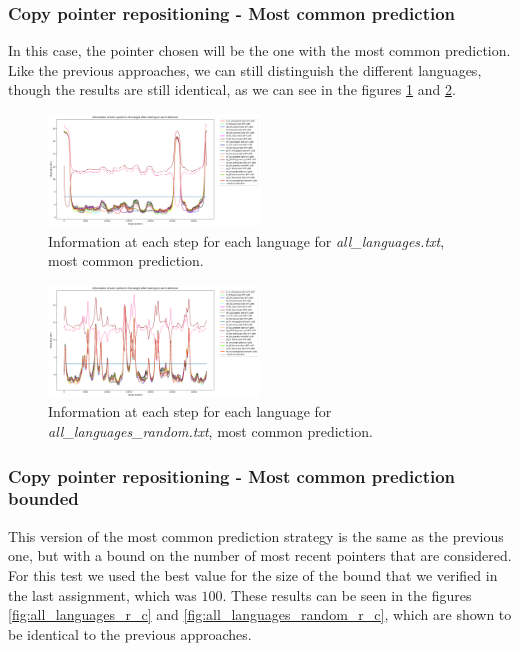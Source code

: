 \documentclass{article}
\begin{document}
\subsubsection{Copy pointer repositioning - Most common prediction}
\label{subsubsec:results_locate_lang_most_common_prediction}

In this case, the pointer chosen will be the one with the most common prediction.
Like the previous approaches, we can still distinguish the different languages, though the results are still identical, as we can see in the figures \ref{fig:all_languages_r_m} and \ref{fig:all_languages_random_r_m}.

\begin{figure}
    \centering
    \includegraphics[width=0.5\textwidth]{../results/all_languages/-r_m.png}
    \caption{Information at each step for each language for \textit{all\_languages.txt}, most common prediction.}
    \label{fig:all_languages_r_m}
\end{figure}

\begin{figure}
    \centering
    \includegraphics[width=0.5\textwidth]{../results/all_languages_random/-r_m.png}
    \caption{Information at each step for each language for \textit{all\_languages\_random.txt}, most common prediction.}
    \label{fig:all_languages_random_r_m}
\end{figure}

\subsubsection{Copy pointer repositioning - Most common prediction bounded}
\label{subsubsec:results_locate_lang_most_common_prediction_bounded}

This version of the most common prediction strategy is the same as the previous one, but with a bound on the number of most recent pointers that are considered.
For this test we used the best value for the size of the bound that we verified in the last assignment, which was $100$.
These results can be seen in the figures \ref{fig:all_languages_r_c} and \ref{fig:all_languages_random_r_c}, which are shown to be identical to the previous approaches.
\end{document}
